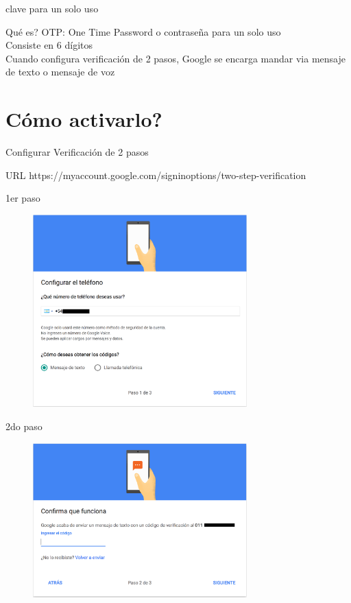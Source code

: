 \documentclass[11pt]{beamer}
\begin{document}
\begin{frame}{clave para un solo uso}
  \begin{block}{Qu\'e es?}
    OTP: One Time Password o contrase\~na para un solo uso\\
    Consiste en 6 d\'igitos\\
    Cuando configura verificaci\'on de 2 pasos, Google se encarga mandar via
    mensaje de texto o mensaje de voz
  \end{block}
\end{frame}
\section{C\'omo activarlo?}
\begin{frame}{Configurar Verificaci\'on de 2 pasos}
  \begin{block}{URL}
    https://myaccount.google.com/signinoptions/two-step-verification
  \end{block}
\end{frame}
\begin{frame}{1er paso}
  \begin{figure}
    \includegraphics[width=3.25in]{1paso.png}
  \end{figure}
\end{frame}
\begin{frame}{2do paso}
  \begin{figure}
    \includegraphics[width=3.25in]{2paso.png}
  \end{figure}
\end{frame}
\end{document}
